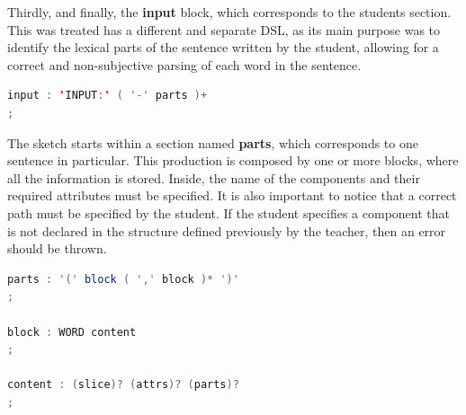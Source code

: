 Thirdly, and finally, the \textbf{input} block, which corresponds to the students section. This was treated has a different and separate \textsc{DSL}, as its main purpose was to identify the lexical parts of the sentence written 
by the student, allowing for a correct and non-subjective parsing of each word in the sentence.

\begin{center}
\begin{minipage}{8cm}
\begin{lstlisting}[language=java, basicstyle=\small, label={lst:dsl_input_prod}, caption=DSL input production]
input : 'INPUT:' ( '-' parts )+
;
\end{lstlisting}
\end{minipage}
\end{center}



The sketch starts within a section named \textbf{parts}, which corresponds to one sentence in particular. This production is composed by one or more blocks, where all the information is stored. Inside, the name of the components and their required attributes must be specified. It is also important to notice that a correct path must be specified by the student. If the student specifies a component that is not declared in the structure defined previously by the teacher, then an error should be thrown.

\begin{center}
\begin{minipage}{10cm}
\begin{lstlisting}[language=java, basicstyle=\small, label={lst:dsl_parts_prod}, caption=DSL parts/component/content productions]
parts : '(' block ( ',' block )* ')'
;

block : WORD content
;

content : (slice)? (attrs)? (parts)?
;
\end{lstlisting}
\end{minipage}
\end{center}

